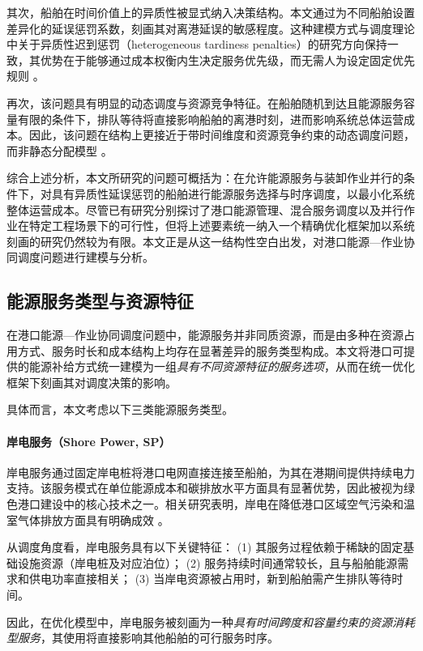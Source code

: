 \documentclass[UTF8, a4paper, 12pt]{ctexart}
\begin{document}
其次，船舶在时间价值上的异质性被显式纳入决策结构。本文通过为不同船舶设置差异化的延误惩罚系数，刻画其对离港延误的敏感程度。这种建模方式与调度理论中关于异质性迟到惩罚（heterogeneous tardiness penalties）的研究方向保持一致，其优势在于能够通过成本权衡内生决定服务优先级，而无需人为设定固定优先规则 \cite{pinedo2016scheduling,vidal2013heuristics}。

再次，该问题具有明显的动态调度与资源竞争特征。在船舶随机到达且能源服务容量有限的条件下，排队等待将直接影响船舶的离港时刻，进而影响系统总体运营成本。因此，该问题在结构上更接近于带时间维度和资源竞争约束的动态调度问题，而非静态分配模型 \cite{brucker2006complexity,cordeau2015transportation}。

综合上述分析，本文所研究的问题可概括为：在允许能源服务与装卸作业并行的条件下，对具有异质性延误惩罚的船舶进行能源服务选择与时序调度，以最小化系统整体运营成本。尽管已有研究分别探讨了港口能源管理、混合服务调度以及并行作业在特定工程场景下的可行性，但将上述要素统一纳入一个精确优化框架加以系统刻画的研究仍然较为有限。本文正是从这一结构性空白出发，对港口能源—作业协同调度问题进行建模与分析。


\subsection{能源服务类型与资源特征}
\label{sec:energy_service_types}

在港口能源—作业协同调度问题中，能源服务并非同质资源，而是由多种在资源占用方式、服务时长和成本结构上均存在显著差异的服务类型构成。本文将港口可提供的能源补给方式统一建模为一组\emph{具有不同资源特征的服务选项}，从而在统一优化框架下刻画其对调度决策的影响。

具体而言，本文考虑以下三类能源服务类型。

\paragraph{岸电服务（Shore Power, SP）}
岸电服务通过固定岸电桩将港口电网直接连接至船舶，为其在港期间提供持续电力支持。该服务模式在单位能源成本和碳排放水平方面具有显著优势，因此被视为绿色港口建设中的核心技术之一。相关研究表明，岸电在降低港口区域空气污染和温室气体排放方面具有明确成效 \cite{andersson2017shipping,bergqvist2019ports}。

从调度角度看，岸电服务具有以下关键特征：  
(1) 其服务过程依赖于稀缺的固定基础设施资源（岸电桩及对应泊位）；  
(2) 服务持续时间通常较长，且与船舶能源需求和供电功率直接相关；  
(3) 当岸电资源被占用时，新到船舶需产生排队等待时间。

因此，在优化模型中，岸电服务被刻画为一种\emph{具有时间跨度和容量约束的资源消耗型服务}，其使用将直接影响其他船舶的可行服务时序。
\end{document}
